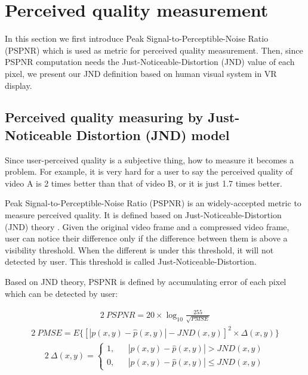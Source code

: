 \section{Perceived quality measurement}

In this section we first introduce Peak Signal-to-Perceptible-Noise Ratio (PSPNR) \cite{PSPNR} which is used as metric for perceived quality measurement. Then, since PSPNR computation needs the Just-Noticeable-Distortion (JND) \cite{JND} value of each pixel, we present our JND definition based on human visual system in VR display.

\subsection{Perceived quality measuring by Just-Noticeable Distortion (JND) model}

Since user-perceived quality is a subjective thing, how to measure it becomes a problem. For example, it is very hard for a user to say the perceived quality of video A is 2 times better than that of video B, or it is just 1.7 times better.

Peak Signal-to-Perceptible-Noise Ratio (PSPNR) \cite{PSPNR} is an widely-accepted metric to measure perceived quality. It is defined based on Just-Noticeable-Distortion (JND) theory \cite{JND}. Given the original video frame and a compressed video frame, user can notice their difference only if the difference between them is above a visibility threshold. When the different is under this threshold, it will not detected by user. This threshold is called Just-Noticeable-Distortion.

Based on JND theory, PSPNR is defined by accumulating error of each pixel which can be detected by user:

\begin{alignat}{2}\
\label{f1} PSPNR = 20 \times \log_{10}\frac{255}{\sqrt{PMSE}}
\end{alignat}
\begin{alignat}{2}\
PMSE=E\{ \left[ |p(x, y) - \hat{p}(x, y)| - JND(x, y)\right]^2 \times \Delta (x, y)\}
\end{alignat}
\begin{alignat}{2}\
\Delta (x, y) =\left\{
\begin{aligned}
1, & &|p(x, y) - \hat{p}(x, y)| > JND(x, y) \\
0, & &|p(x, y) - \hat{p}(x, y)| \le JND(x, y)
\end{aligned}
\right.
\end{alignat}

